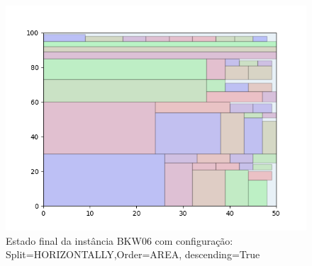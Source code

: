 \begin{figure}[H]
    \centering
    \caption[]{Estado final da instância BKW06 com configuração: Split=HORIZONTALLY,Order=AREA, descending=True}
    \label{fig:bkw06-horizontally-area-true}
    \includegraphics[scale=0.5]{output/figures/bkw/bkw06/horizontally/area/true/00}
\end{figure}